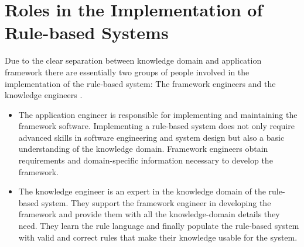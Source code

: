 \section{Roles in the Implementation of Rule-based Systems}\label{sec:roles-in-the-implementation-of-rule-based-systems}
Due to the clear separation between knowledge domain and application framework there are essentially two groups of people
involved in the implementation of the rule-based system:
The framework engineers and the knowledge engineers \cite{jacob1990software}.
\begin{itemize}
    \item The application engineer is responsible for implementing and maintaining the framework software.
    Implementing a rule-based system does not only require advanced skills in software engineering and system design but also a basic understanding of the knowledge domain.
    Framework engineers obtain requirements and domain-specific information necessary to develop the framework.
    \item The knowledge engineer is an expert in the knowledge domain of the rule-based system.
    They support the framework engineer in developing the framework and provide them with all the knowledge-domain details they need.
    They learn the rule language and finally populate the rule-based system with valid and correct rules that make their knowledge usable for the system.
\end{itemize}
